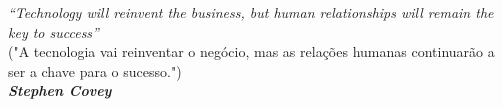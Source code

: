 \begin{epigrafe}
    \vspace*{\fill}
	\begin{flushright}
		\textit{``Technology will reinvent the business, but human relationships will remain the key to success''} \\("A tecnologia vai reinventar o negócio, mas as relações humanas continuarão a ser a chave para o sucesso.")\\
	\textit{\bfseries Stephen Covey}
	\end{flushright}
\end{epigrafe}
